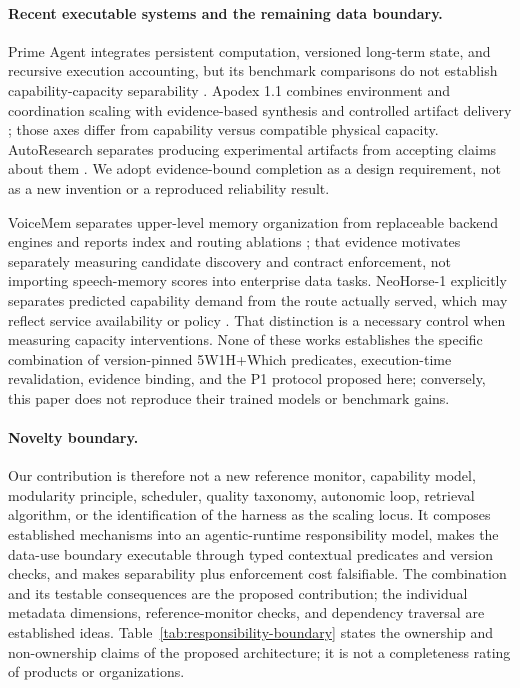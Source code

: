 \documentclass[11pt]{article}
\begin{document}
\paragraph{Recent executable systems and the remaining data boundary.}
Prime Agent integrates persistent computation, versioned long-term state, and recursive execution accounting, but its benchmark comparisons do not establish capability-capacity separability \cite{karten2026prime}. Apodex 1.1 combines environment and coordination scaling with evidence-based synthesis and controlled artifact delivery \cite{apodex2026}; those axes differ from capability versus compatible physical capacity. AutoResearch separates producing experimental artifacts from accepting claims about them \cite{ren2026autoresearch}. We adopt evidence-bound completion as a design requirement, not as a new invention or a reproduced reliability result.

VoiceMem separates upper-level memory organization from replaceable backend engines and reports index and routing ablations \cite{xie2026voicemem}; that evidence motivates separately measuring candidate discovery and contract enforcement, not importing speech-memory scores into enterprise data tasks. NeoHorse-1 explicitly separates predicted capability demand from the route actually served, which may reflect service availability or policy \cite{neohorse2026}. That distinction is a necessary control when measuring capacity interventions. None of these works establishes the specific combination of version-pinned 5W1H+Which predicates, execution-time revalidation, evidence binding, and the P1 protocol proposed here; conversely, this paper does not reproduce their trained models or benchmark gains.

\paragraph{Novelty boundary.}
Our contribution is therefore not a new reference monitor, capability model, modularity principle, scheduler, quality taxonomy, autonomic loop, retrieval algorithm, or the identification of the harness as the scaling locus. It composes established mechanisms into an agentic-runtime responsibility model, makes the data-use boundary executable through typed contextual predicates and version checks, and makes separability plus enforcement cost falsifiable. The combination and its testable consequences are the proposed contribution; the individual metadata dimensions, reference-monitor checks, and dependency traversal are established ideas. Table~\ref{tab:responsibility-boundary} states the ownership and non-ownership claims of the proposed architecture; it is not a completeness rating of products or organizations.
\end{document}
